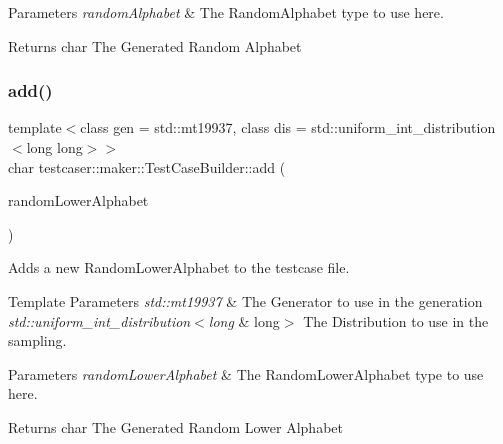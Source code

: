 \begin{DoxyParams}{Parameters}
{\em random\+Alphabet} & The Random\+Alphabet type to use here. \\
\hline
\end{DoxyParams}
\begin{DoxyReturn}{Returns}
char The Generated Random Alphabet 
\end{DoxyReturn}
\mbox{\label{classtestcaser_1_1maker_1_1TestCaseBuilder_a0666074618ac122218a4206b5952ca07}} 
\subsubsection{\texorpdfstring{add()}{add()}\hspace{0.1cm}{\footnotesize\ttfamily [2/11]}}
{\footnotesize\ttfamily template$<$class gen  = std\+::mt19937, class dis  = std\+::uniform\+\_\+int\+\_\+distribution$<$long long$>$$>$ \\
char testcaser\+::maker\+::\+Test\+Case\+Builder\+::add (\begin{DoxyParamCaption}\item[{\mbox{\hyperlink{classtestcaser_1_1maker_1_1types_1_1RandomLowerAlphabet}{types\+::\+Random\+Lower\+Alphabet}}$<$ gen, dis $>$ \&}]{random\+Lower\+Alphabet }\end{DoxyParamCaption})\hspace{0.3cm}{\ttfamily [inline]}}



Adds a new Random\+Lower\+Alphabet to the testcase file. 


\begin{DoxyTemplParams}{Template Parameters}
{\em std\+::mt19937} & The Generator to use in the generation \\
\hline
{\em std\+::uniform\+\_\+int\+\_\+distribution$<$long} & long$>$ The Distribution to use in the sampling. \\
\hline
\end{DoxyTemplParams}

\begin{DoxyParams}{Parameters}
{\em random\+Lower\+Alphabet} & The Random\+Lower\+Alphabet type to use here. \\
\hline
\end{DoxyParams}
\begin{DoxyReturn}{Returns}
char The Generated Random Lower Alphabet 
\end{DoxyReturn}
\mbox{\label{classtestcaser_1_1maker_1_1TestCaseBuilder_a0d02a42731de8cffd9cc5be67d49290e}} 
